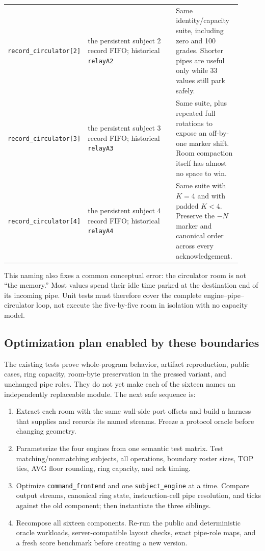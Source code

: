 \documentclass[11pt,a4paper]{article}
\begin{document}
\begin{longtable}{
  >{\raggedright\arraybackslash}p{0.24\linewidth}
  >{\raggedright\arraybackslash}p{0.38\linewidth}
  >{\raggedright\arraybackslash}p{0.29\linewidth}}
\texttt{record\_circulator[2]} &
the persistent subject 2 record FIFO; historical \texttt{relayA2} &
Same identity/capacity suite, including zero and 100 grades. Shorter pipes
are useful only while 33 values still park safely.\\
\texttt{record\_circulator[3]} &
the persistent subject 3 record FIFO; historical \texttt{relayA3} &
Same suite, plus repeated full rotations to expose an off-by-one marker
shift. Room compaction itself has almost no space to win.\\
\texttt{record\_circulator[4]} &
the persistent subject 4 record FIFO; historical \texttt{relayA4} &
Same suite with $K=4$ and with padded $K<4$. Preserve the $-N$ marker and
canonical order across every acknowledgement.\\
\end{longtable}
\normalsize

This naming also fixes a common conceptual error: the circulator room is not
``the memory.'' Most values spend their idle time parked at the destination
end of its incoming pipe. Unit tests must therefore cover the complete
engine--pipe--circulator loop, not execute the five-by-five room in isolation
with no capacity model.

\subsection{Optimization plan enabled by these boundaries}

The existing tests prove whole-program behavior, artifact reproduction,
public cases, ring capacity, room-byte preservation in the pressed variant,
and unchanged pipe roles. They do not yet make each of the sixteen names an
independently replaceable module. The next safe sequence is:

\begin{enumerate}
  \item Extract each room with the same wall-side port offsets and build a
        harness that supplies and records its named streams. Freeze a
        protocol oracle before changing geometry.
  \item Parameterize the four engines from one semantic test matrix. Test
        matching/nonmatching subjects, all operations, boundary roster
        sizes, TOP ties, AVG floor rounding, ring capacity, and ack timing.
  \item Optimize \texttt{command\_frontend} and one
        \texttt{subject\_engine} at a time. Compare output streams,
        canonical ring state, instruction-cell pipe resolution, and ticks
        against the old component; then instantiate the three siblings.
  \item Recompose all sixteen components. Re-run the public and deterministic
        oracle workloads, server-compatible layout checks, exact pipe-role
        maps, and a fresh score benchmark before creating a new version.
\end{enumerate}
\end{document}
